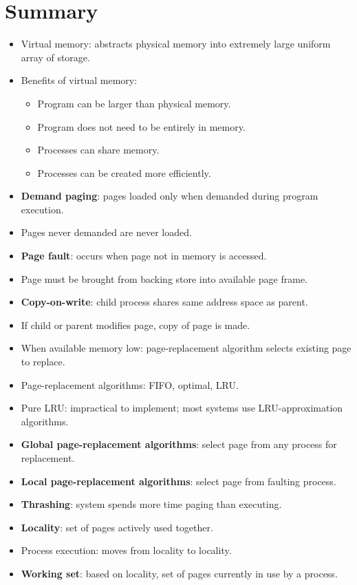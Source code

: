 \section{Summary}
\begin{itemize}
    \item Virtual memory: abstracts physical memory into extremely large uniform array of storage.
    \item Benefits of virtual memory:
    \begin{itemize}
        \item Program can be larger than physical memory.
        \item Program does not need to be entirely in memory.
        \item Processes can share memory.
        \item Processes can be created more efficiently.
    \end{itemize}
    \item \textbf{Demand paging}: pages loaded only when demanded during program execution.
    \item Pages never demanded are never loaded.
    \item \textbf{Page fault}: occurs when page not in memory is accessed.
    \item Page must be brought from backing store into available page frame.
    \item \textbf{Copy-on-write}: child process shares same address space as parent.
    \item If child or parent modifies page, copy of page is made.
    \item When available memory low: page-replacement algorithm selects existing page to replace.
    \item Page-replacement algorithms: FIFO, optimal, LRU.
    \item Pure LRU: impractical to implement; most systems use LRU-approximation algorithms.
    \item \textbf{Global page-replacement algorithms}: select page from any process for replacement.
    \item \textbf{Local page-replacement algorithms}: select page from faulting process.
    \item \textbf{Thrashing}: system spends more time paging than executing.
    \item \textbf{Locality}: set of pages actively used together.
    \item Process execution: moves from locality to locality.
    \item \textbf{Working set}: based on locality, set of pages currently in use by a process.

\end{itemize}
